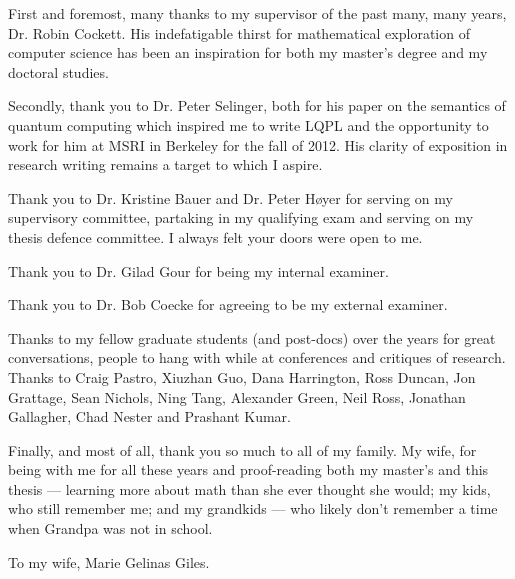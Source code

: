 \documentclass{ucalgthes1}
\begin{document}
\newpage
{}
{}

First and foremost, many thanks to my supervisor of the past many, many years, Dr. Robin
Cockett. His indefatigable thirst for mathematical exploration of computer science has been an
inspiration for both my master's degree and my doctoral studies.

Secondly, thank you to Dr. Peter Selinger, both for his paper on the semantics of quantum computing
which inspired me to write LQPL and the opportunity to work for him at MSRI in Berkeley for the fall
of 2012. His clarity of exposition in research writing remains a target to which I aspire.

Thank you to Dr. Kristine Bauer and Dr. Peter Høyer for serving on my supervisory committee,
partaking in my qualifying exam and serving on my thesis defence committee. I always felt your doors
were open to me.

Thank you to Dr. Gilad Gour for being my internal examiner.

Thank you to Dr. Bob Coecke for agreeing to be my external examiner.

Thanks to my fellow graduate students (and post-docs) over the years for great conversations, people
to hang with while at conferences and critiques of research. Thanks to Craig Pastro, Xiuzhan Guo,
Dana Harrington, Ross Duncan, Jon Grattage, Sean Nichols, Ning Tang, Alexander Green, Neil Ross,
Jonathan Gallagher, Chad Nester and Prashant Kumar.

Finally, and most of all, thank you so much to all of my family. My wife, for being with me for all
these years and proof-reading both my master's and this thesis --- learning more about math than she
ever thought she would; my kids, who still remember me; and my grandkids --- who likely don't remember a time
when Grandpa was not in school.
\newpage
{}
{}
\vspace{3in}
\begin{flushright}
To my wife, Marie Gelinas Giles.
\end{flushright}


\begin{singlespace}
\newpage
{}
\tableofcontents
\pagestyle{plain}
\newpage
{}
\listoftables
\pagestyle{plain}
\newpage
{}
\listoffigures
\pagestyle{plain}
\clearpage
\clearpage          %
\end{singlespace}
\newpage
{}
\end{document}
